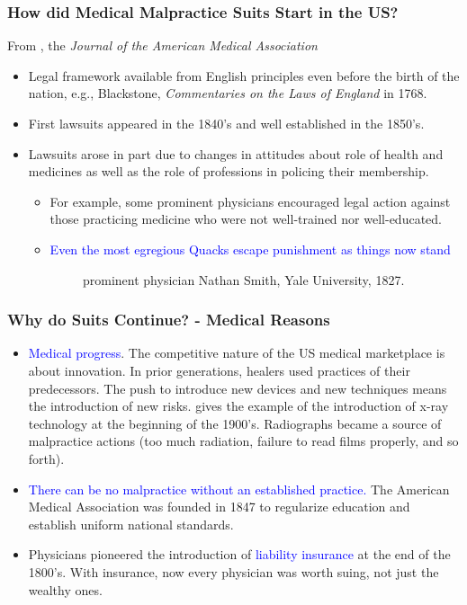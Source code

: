 \documentclass[serif,10pt]{beamer}
\begin{document}
\begin{frame}
\frametitle{How did Medical Malpractice Suits Start in the US?}
From \cite{mohr2000american}, the \textit{Journal of the American Medical Association}
  \begin{itemize}
\item Legal framework available from English principles even before the birth of the nation, e.g., Blackstone, \textit{Commentaries on the Laws of England} in 1768.
\item First lawsuits appeared in the 1840's and well established in the 1850's.
\item Lawsuits arose in part due to changes in attitudes about role of health and medicines as well as the role of professions in policing their membership.
  \begin{itemize}
\item For example, some prominent physicians encouraged legal action against those practicing medicine who were not well-trained nor well-educated.
\item \textcolor{blue}{Even the most egregious Quacks escape punishment as things now stand}
\end{itemize}
\end{itemize}
~~~~~~~~~~~~prominent physician Nathan Smith, Yale University, 1827.
\end{frame}

\begin{frame}
\frametitle{Why do Suits Continue? - Medical Reasons}
  \begin{itemize}
\item \textcolor{blue}{Medical progress}. The competitive nature of the US medical marketplace is about innovation. In prior generations, healers used practices of their predecessors. The push to introduce new devices and new techniques means the introduction of new risks. \cite{mohr2000american} gives the example of the introduction of x-ray technology at the beginning of the 1900's. Radiographs became a source of malpractice actions (too much radiation, failure to read films properly, and so forth).
\item  \textcolor{blue}{There can be no malpractice without an established practice.} The American Medical Association was founded in 1847 to regularize education and establish uniform national standards.
\item Physicians pioneered the introduction of \textcolor{blue}{liability insurance} at the end of the 1800's. With insurance, now every physician was worth suing, not just the wealthy ones.
\end{itemize}
\end{frame}
\end{document}
